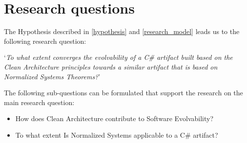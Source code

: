 \section{Research questions} \label{research_questions}
The Hypothesis described in \ref{hypothesis} and \ref{research_model} leads us to the
following research question:

\begin{center}
    \enquote*{\textit{To what extent converges the evolvability of a C\# artifact built
    based on the Clean Architecture principles towards a similar artifact that is based on
    Normalized Systems Theorems?}}
\end{center}

The following sub-questions can be formulated that support the research on the main
research question:
\begin{itemize}
    \item How does Clean Architecture contribute to Software Evolvability?
    \item To what extent Is Normalized Systems applicable to a C\# artifact?   
\end{itemize}